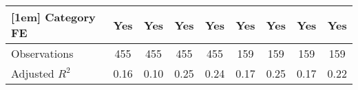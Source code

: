 {\begin{tabular}{l*{8}{c}}
[1em]
Category FE                        &       Yes         &       Yes         &       Yes         &       Yes         &       Yes         &       Yes         &       Yes         &       Yes         \\
\hline
Observations                       &       455         &       455         &       455         &       455         &       159         &       159         &       159         &       159         \\
Adjusted \(R^{2}\)                 &      0.16         &      0.10         &      0.25         &      0.24         &      0.17         &      0.25         &      0.17         &      0.22         \\
\hline\hline
\end{tabular}
}

